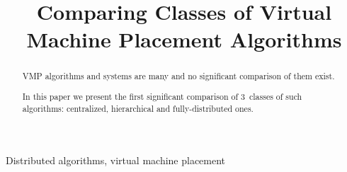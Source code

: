\documentclass[10pt, conference, compsocconf]{IEEEtran}
\begin{document}
\title{Comparing Classes of Virtual Machine Placement Algorithms}


\author{
}

\maketitle

\tableofcontents


\newpage


\begin{abstract}
  VMP algorithms and systems are many and no significant comparison of
  them exist.

  In this paper we present the first significant comparison of
  3~classes of such algorithms: centralized, hierarchical and
  fully-distributed ones.
\end{abstract}

\begin{IEEEkeywords}
  Distributed algorithms, virtual machine placement
\end{IEEEkeywords}


%
\IEEEpeerreviewmaketitle







\end{document}
